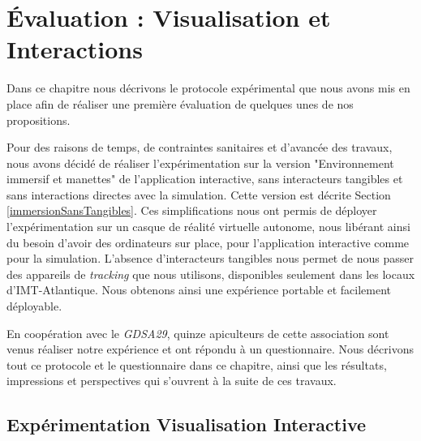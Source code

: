 \chapter{Évaluation : Visualisation et Interactions}
\label{ChapitreEvalVR}

	Dans ce chapitre nous décrivons le protocole expérimental que nous avons mis en place afin de réaliser une première évaluation de quelques unes de nos propositions.
	
	Pour des raisons de temps, de contraintes sanitaires et d'avancée des travaux, nous avons décidé de réaliser l'expérimentation sur la version "Environnement immersif et manettes" de l'application interactive, sans interacteurs tangibles et sans interactions directes avec la simulation. Cette version est décrite Section \ref{immersionSansTangibles}. Ces simplifications nous ont permis de déployer l'expérimentation sur un casque de réalité virtuelle autonome, nous libérant ainsi du besoin d'avoir des ordinateurs sur place, pour l'application interactive comme pour la simulation. L'absence d'interacteurs tangibles nous permet de nous passer des appareils de \textit{tracking} que nous utilisons, disponibles seulement dans les locaux d'IMT-Atlantique. Nous obtenons ainsi une expérience portable et facilement déployable.
	
	En coopération avec le \textit{GDSA29}, quinze apiculteurs de cette association sont venus réaliser notre expérience et ont répondu à un questionnaire. Nous décrivons tout ce protocole et le questionnaire dans ce chapitre, ainsi que les résultats, impressions et perspectives qui s'ouvrent à la suite de ces travaux.

	\section{Expérimentation Visualisation Interactive}
		\label{sectionExpe}
		
